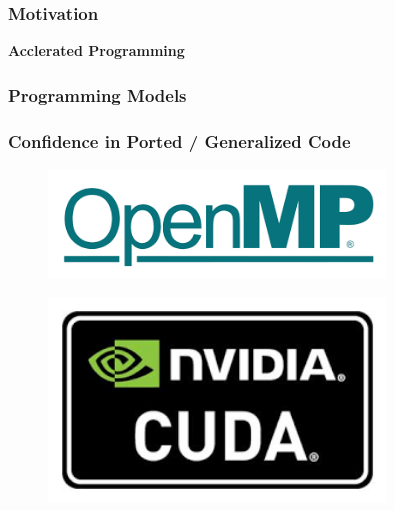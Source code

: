\documentclass[aspectratio=1610,10pt]{penchbeamer}
\begin{document}
\begin{frame}
  \frametitle{Motivation}

  \begin{center}
    \begin{huge}
      \textbf{Acclerated Programming}
    \end{huge}
  \end{center}
\end{frame}

\begin{frame}
  \frametitle{Programming Models}
  \frametitle{Confidence in Ported / Generalized Code}


  \begin{minipage}{0.3\textwidth}
    \begin{figure}
      \begin{center}
        \includegraphics[width=0.8\textwidth]{static/openmp.png}
      \end{center}
    \end{figure}
  \end{minipage}
  \begin{minipage}{0.3\textwidth}
    \begin{figure}
      \begin{center}
        \includegraphics[width=0.8\textwidth]{static/cuda.png}
      \end{center}
    \end{figure}
  \end{minipage}
  \begin{minipage}{0.3\textwidth}

\end{minipage}
\end{frame}
\end{document}
